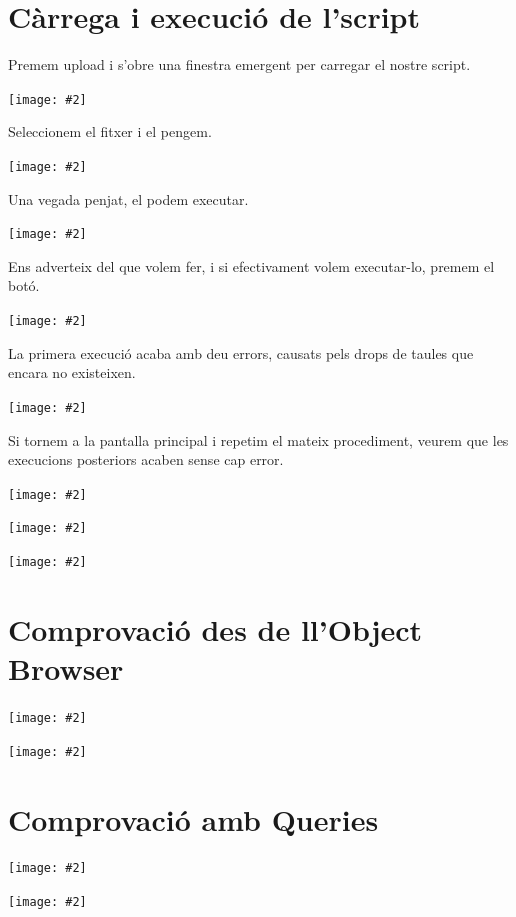 \documentclass[a4paper,12pt]{article}
\newcommand{\mygraphic}[2][width=\textwidth]{\begin{center}
		\centering\texttt{[image: \#2]}\par
\end{center}}
\begin{document}


\section{Càrrega i execució de l'script}
Premem upload i s'obre una finestra emergent per carregar el nostre script.
\mygraphic{imatges/1.png}

Seleccionem el fitxer i el pengem.
\mygraphic{imatges/2.png}

\newpage
Una vegada penjat, el podem executar.
\mygraphic{imatges/3.png}

Ens adverteix del que volem fer, i si efectivament volem executar-lo, premem el botó.
\mygraphic{imatges/4.png}

\newpage
La primera execució acaba amb deu errors, causats pels drops de taules que encara no existeixen.
\mygraphic{imatges/5.png}

Si tornem a la pantalla principal i repetim el mateix procediment, veurem que les execucions posteriors acaben sense cap error.
\mygraphic{imatges/6.png}
\mygraphic{imatges/7.png}
\mygraphic{imatges/8.png}

\section{Comprovació des de ll'Object Browser}
\mygraphic{imatges/9.png}
\mygraphic{imatges/10.png}

\section{Comprovació amb Queries}
\mygraphic{imatges/11.png}
\mygraphic{imatges/12.png}
\end{document}
